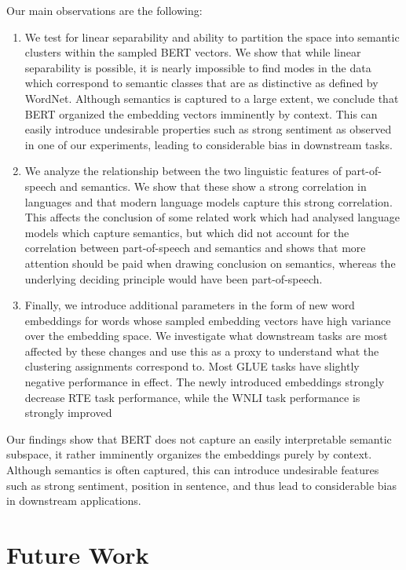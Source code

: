\documentclass[a4paper,12pt,oneside,openright]{report}
\begin{document}
Our main observations are the following: \\

\begin{enumerate}
\item We test for linear separability and ability to partition the space into semantic clusters within the sampled BERT vectors.
We show that while linear separability is possible, it is nearly impossible to find modes in the data which correspond to semantic classes that are as distinctive as defined by WordNet.
Although semantics is captured to a large extent, we conclude that BERT organized the embedding vectors imminently by context. 
This can easily introduce undesirable properties such as strong sentiment as observed in one of our experiments, leading to considerable bias in downstream tasks.
\item We analyze the relationship between the two linguistic features of part-of-speech and semantics. 
We show that these show a strong correlation in languages and that modern language models capture this strong correlation.
This affects the conclusion of some related work which had analysed language models which capture semantics, but which did not account for the correlation between part-of-speech and semantics and shows that more attention should be paid when drawing conclusion on semantics, whereas the underlying deciding principle would have been part-of-speech.
\item Finally, we introduce additional parameters in the form of new word embeddings for words whose sampled embedding vectors have high variance over the embedding space.
We investigate what downstream tasks are most affected by these changes and use this as a proxy to understand what the clustering assignments correspond to. 
Most GLUE tasks have slightly negative performance in effect. 
The newly introduced embeddings strongly decrease RTE task performance, while the WNLI task performance is strongly improved
\end{enumerate}

\hfill \break

Our findings show that BERT does not capture an easily interpretable semantic subspace, it rather imminently organizes the embeddings purely by context.
Although semantics is often captured, this can introduce undesirable features such as strong sentiment, position in sentence, and thus lead to considerable bias in downstream applications.

\section{Future Work}
\end{document}
